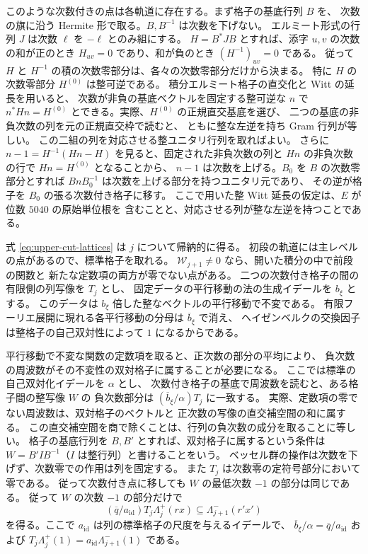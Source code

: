 このような次数付きの点は各軌道に存在する。まず格子の基底行列 \(B\) を、
次数の旗に沿う Hermite 形で取る。\(B,B^{-1}\) は次数を下げない。
エルミート形式の行列 \(J\) は次数 \(\ell\) を \(-\ell\) とのみ組にする。
\(H=B^\ast J B\) とすれば、添字 \(u,v\) の次数の和が正のとき
\(H_{uv}=0\) であり、和が負のとき \((H^{-1})_{uv}=0\) である。
従って \(H\) と \(H^{-1}\) の積の次数零部分は、各々の次数零部分だけから決まる。
特に \(H\) の次数零部分 \(H^{(0)}\) は整可逆である。
積分エルミート格子の直交化と Witt の延長を用いると、
次数が非負の基底ベクトルを固定する整可逆な \(n\) で
\(n^\ast H n=H^{(0)}\) とできる。実際、\(H^{(0)}\) の正規直交基底を選び、
二つの基底の非負次数の列を元の正規直交枠で読むと、
ともに整な左逆を持ち Gram 行列が等しい。
この二組の列を対応させる整ユニタリ行列を取ればよい。
さらに \(n-1=H^{-1}(Hn-H)\) を見ると、固定された非負次数の列と
\(Hn\) の非負次数の行で \(Hn=H^{(0)}\) となることから、
\(n-1\) は次数を上げる。\(B_0\) を \(B\) の次数零部分とすれば
\(BnB_0^{-1}\) は次数を上げる部分を持つユニタリ元であり、
その逆が格子を \(B_0\) の張る次数付き格子に移す。
ここで用いた整 Witt 延長の仮定は、\(E\) が位数 \(5040\) の原始単位根を
含むことと、対応させる列が整な左逆を持つことである。

式 \eqref{eq:upper-cut-lattices} は \(j\) について帰納的に得る。
初段の軌道には主レベルの点があるので、標準格子を取れる。
\(\mathcal W_{j+1}\ne0\) なら、開いた積分の中で前段の関数と
新たな定数項の両方が零でない点がある。
二つの次数付き格子の間の有限側の列写像を \(T_j\) とし、
固定データの平行移動の法の生成イデールを \(b_\xi\) とする。
このデータは \(b_\xi\) 倍した整なベクトルの平行移動で不変である。
有限フーリエ展開に現れる各平行移動の分母は \(\overline b_\xi\) で消え、
ヘイゼンベルクの交換因子は整格子の自己双対性によって \(1\) になるからである。

平行移動で不変な関数の定数項を取ると、正次数の部分の平均により、
負次数の周波数がその不変性の双対格子に属することが必要になる。
ここでは標準の自己双対化イデールを \(\alpha\) とし、
次数付き格子の基底で周波数を読むと、ある格子間の整写像 \(W\) の
負次数部分は \((\overline b_\xi/\alpha)T_j\) に一致する。
実際、定数項の零でない周波数は、双対格子のベクトルと
正次数の写像の直交補空間の和に属する。
この直交補空間を商で除くことは、行列の負次数の成分を取ることに等しい。
格子の基底行列を \(B,B'\) とすれば、双対格子に属するという条件は
\(W=B' I B^{-1}\)（\(I\) は整行列）と書けることをいう。
ベッセル群の操作は次数を下げず、次数零での作用は列を固定する。
また \(T_j\) は次数零の定符号部分において零である。
従って次数付き点に移しても \(W\) の最低次数 \(-1\) の部分は同じである。
従って \(W\) の次数 \(-1\) の部分だけで
\[
   (\overline q/a_\mathrm{id})T_j\Lambda_j^+(r x)
          \subseteq\Lambda_{j+1}^-(r' x')
\]
を得る。ここで \(a_\mathrm{id}\) は列の標準格子の尺度を与えるイデールで、
\(\overline b_\xi/\alpha=\overline q/a_\mathrm{id}\) および
\(T_j\Lambda_j^+(1)=a_\mathrm{id}\Lambda_{j+1}^-(1)\) である。

